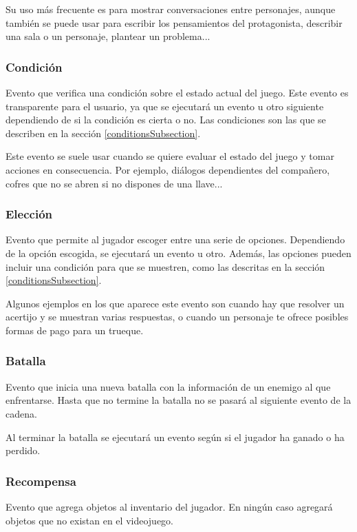 Su uso más frecuente es para mostrar conversaciones entre personajes, aunque también se puede usar para escribir los pensamientos del protagonista, describir una sala o un personaje, plantear un problema...

\subsubsection{Condición}
Evento que verifica una condición sobre el estado actual del juego. Este evento es transparente para el usuario, ya que se ejecutará un evento u otro siguiente dependiendo de si la condición es cierta o no. Las condiciones son las que se describen en la sección \ref{conditionsSubsection}.

Este evento se suele usar cuando se quiere evaluar el estado del juego y tomar acciones en consecuencia. Por ejemplo, diálogos dependientes del compañero, cofres que no se abren si no dispones de una llave...

\subsubsection{Elección}
Evento que permite al jugador escoger entre una serie de opciones. Dependiendo de la opción escogida, se ejecutará un evento u otro. Además, las opciones pueden incluir una condición para que se muestren, como las descritas en la sección \ref{conditionsSubsection}.

Algunos ejemplos en los que aparece este evento son cuando hay que resolver un acertijo y se muestran varias respuestas, o cuando un personaje te ofrece posibles formas de pago para un trueque.

\subsubsection{Batalla}
Evento que inicia una nueva batalla con la información de un enemigo al que enfrentarse.
Hasta que no termine la batalla no se pasará al siguiente evento de la cadena.

Al terminar la batalla se ejecutará un evento según si el jugador ha ganado o ha perdido.

\subsubsection{Recompensa}
Evento que agrega objetos al inventario del jugador. En ningún caso agregará objetos que no existan en el videojuego.

